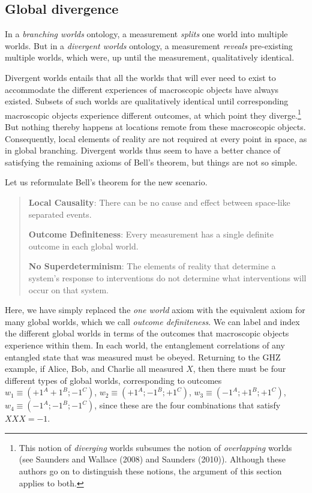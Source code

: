 \documentclass[a4paper]{article}
\begin{document}
\subsection{Global divergence} \label{sec:GlobDiv}

 In a \textit{branching worlds} ontology, a measurement \textit{splits} one world into multiple worlds. But in a \textit{divergent worlds} ontology, a measurement \textit{reveals} pre-existing multiple worlds, which were, up until the measurement, qualitatively identical. 
 
 Divergent worlds entails that all the worlds that will ever need to exist to accommodate the different experiences of macroscopic objects have always existed. Subsets of such worlds are qualitatively identical until corresponding macroscopic objects experience different outcomes, at which point they diverge.\footnote{This notion of \textit{diverging} worlds subsumes the notion of \textit{overlapping} worlds (see Saunders and Wallace (2008) and Saunders (2010)). Although these authors go on to distinguish these notions, the argument of this section applies to both.} But nothing thereby happens at locations remote from these macroscopic objects. Consequently, local elements of reality are not required at every point in space, as in global branching. Divergent worlds thus seem to have a better chance of satisfying the remaining axioms of Bell’s theorem, but things are not so simple. 

Let us reformulate Bell’s theorem for the new
scenario.

\begin{quote}
\textbf{Local Causality}: There can be no cause and effect between space-like separated events.

\textbf{Outcome Definiteness}: Every measurement has a single definite outcome in each global world.

\textbf{No Superdeterminism}: The elements of reality that determine a system's response to interventions do not determine what interventions will occur on that system.
\end{quote}

Here, we have simply replaced the \textit{one world} axiom with the equivalent axiom for many global worlds, which we call \textit{outcome definiteness}. We can label and index the different global worlds in terms of the outcomes that macroscopic objects experience
within them. In each world, the entanglement correlations of any entangled state that was measured must be obeyed. Returning to the GHZ example, if Alice, Bob, and Charlie all measured $X$, then there must be four different types of global worlds, corresponding to outcomes $w_1 \equiv (+1^A +1^B;-1^C)$,
$w_2 \equiv (+1^A;-1^B;+1^C)$, $w_3 \equiv (-1^A;+1^B;+1^C)$, $w_4 \equiv (-1^A;-1^B;-1^C)$, since these are the four combinations that satisfy $XXX = -1$.
\end{document}
